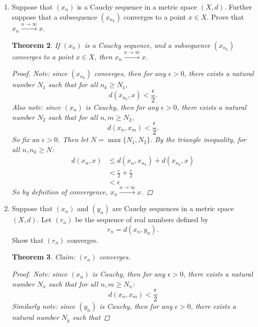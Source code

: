 \documentclass{amsart}
\newtheorem{theorem}{Theorem}
\begin{document}
\begin{enumerate}[1.]
\begin{theorem}
\begin{proof}
        Thus, we have found a sequence $(x_n)$ such that $(|x_n|)$ converges, but $(x_n)$ does not converge.
    \end{proof}
\end{theorem}

\newpage
\item Suppose that $(x_n)$ is a Cauchy sequence in a metric space $(X,d)$. Further suppose that a subsequence $(x_{n_k})$ converges to a point $x \in X$. Prove that $x_n \xrightarrow{n \to \infty} x$.
\begin{theorem} If $(x_n)$ is a Cauchy sequence, and a subsequence $(x_{n_k})$ converges to a point $x \in X$, then $x_n \xrightarrow{n \to \infty} x$.
    \begin{proof}
        Note: since $(x_{n_k})$ converges, then for any $\epsilon > 0$, there exists a natural number $N_1$ such that for all
        $n_k \geq N_1$, 
        \[
            d(x_{n_k}, x) < \frac{\epsilon}{2}.
        \]
        Also note: since $(x_n)$ is Cauchy, then for any $\epsilon > 0$, there exists a natural number $N_2$ such that for all
        $n,m \geq N_2$, 
        \[
            d(x_n, x_m) < \frac{\epsilon}{2}.
        \]
        So fix an $\epsilon > 0$. Then let $N = \max \{N_1, N_2\}$. By the triangle inequality, for all $n, n_k \geq N$:
        \begin{align*}
            d(x_n, x) &\leq d(x_n, x_{n_k}) + d(x_{n_k}, x) \\
            &< \frac{\epsilon}{2} + \frac{\epsilon}{2} \\
            &< \epsilon
        \end{align*}
        So by defnition of convergence, $x_n \xrightarrow{n \to \infty} x$. 
    \end{proof}
\end{theorem}
\newpage
\item Suppose that $(x_n)$ and $(y_n)$ are Cauchy sequences in a metric space $(X,d)$. Let $(r_n)$ be the sequence of real numbers defined by
\[ r_n = d(x_n, y_n). \]
Show that $(r_n)$ converges.
\begin{theorem} Claim: $(r_n)$ converges.
    \begin{proof}
        Note: since $(x_n)$ is Cauchy, then for any $\epsilon > 0$, there exists a natural number $N_x$ such that
        for all $n,m \geq N_x$:
        \[
            d(x_n, x_m) < \frac{\epsilon}{2}
        \]
        Similarly note: since $(y_n)$ is Cauchy, then for any $\epsilon > 0$, there exists a natural number $N_y$ such that

\end{proof}
\end{theorem}
\end{enumerate}
\end{document}
